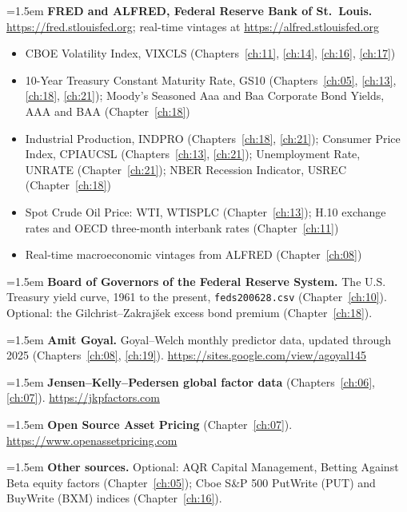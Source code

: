 \hangindent=1.5em \textbf{FRED and ALFRED, Federal Reserve Bank of St.\ Louis.} \url{https://fred.stlouisfed.org}; real-time vintages at \url{https://alfred.stlouisfed.org}
\begin{itemize}\setlength{\itemsep}{0pt}\setlength{\parskip}{0pt}
  \item CBOE Volatility Index, VIXCLS (Chapters~\ref{ch:11}, \ref{ch:14}, \ref{ch:16}, \ref{ch:17})
  \item 10-Year Treasury Constant Maturity Rate, GS10 (Chapters~\ref{ch:05}, \ref{ch:13}, \ref{ch:18}, \ref{ch:21}); Moody's Seasoned Aaa and Baa Corporate Bond Yields, AAA and BAA (Chapter~\ref{ch:18})
  \item Industrial Production, INDPRO (Chapters~\ref{ch:18}, \ref{ch:21}); Consumer Price Index, CPIAUCSL (Chapters~\ref{ch:13}, \ref{ch:21}); Unemployment Rate, UNRATE (Chapter~\ref{ch:21}); NBER Recession Indicator, USREC (Chapter~\ref{ch:18})
  \item Spot Crude Oil Price: WTI, WTISPLC (Chapter~\ref{ch:13}); H.10 exchange rates and OECD three-month interbank rates (Chapter~\ref{ch:11})
  \item Real-time macroeconomic vintages from ALFRED (Chapter~\ref{ch:08})
\end{itemize}

\hangindent=1.5em \textbf{Board of Governors of the Federal Reserve System.} The U.S. Treasury yield curve, 1961 to the present, \texttt{feds200628.csv} (Chapter~\ref{ch:10}). Optional: the Gilchrist--Zakraj\v{s}ek excess bond premium (Chapter~\ref{ch:18}).

\hangindent=1.5em \textbf{Amit Goyal.} Goyal--Welch monthly predictor data, updated through 2025 (Chapters~\ref{ch:08}, \ref{ch:19}). \url{https://sites.google.com/view/agoyal145}

\hangindent=1.5em \textbf{Jensen--Kelly--Pedersen global factor data} (Chapters~\ref{ch:06}, \ref{ch:07}). \url{https://jkpfactors.com}

\hangindent=1.5em \textbf{Open Source Asset Pricing} (Chapter~\ref{ch:07}). \url{https://www.openassetpricing.com}

\hangindent=1.5em \textbf{Other sources.} Optional: AQR Capital Management, Betting Against Beta equity factors (Chapter~\ref{ch:05}); Cboe S\&P 500 PutWrite (PUT) and BuyWrite (BXM) indices (Chapter~\ref{ch:16}).

\endgroup
